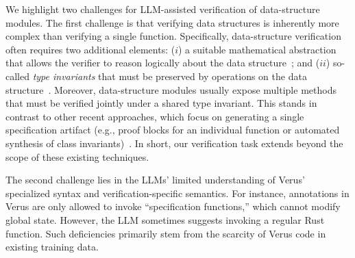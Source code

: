 We highlight two challenges for LLM-assisted verification of data-structure modules.
The first challenge is that verifying data structures is inherently more complex than verifying a single function. Specifically, data-structure verification often requires two additional elements:
($i$) a suitable mathematical abstraction that allows the verifier to reason logically about the data structure~\cite{reynolds-seplogic,parkinson-bierman,ohearn-cacm}; and ($ii$)
so-called \emph{type invariants} that must be preserved by operations on the data structure~\cite{classinvgen,pldi-invariant}.
Moreover, data-structure modules usually expose multiple methods that must be verified jointly under a shared type invariant. This stands in contrast to other recent approaches, which focus on generating a single specification artifact (e.g., proof blocks for an individual function or automated synthesis of class invariants)~\cite{autoverus,dafny-annotator,dafnysinglemethod,cav24llm,classinvgen,lemur,loopy}. In short, our verification task extends beyond the scope of these existing techniques.

The second challenge lies in the LLMs' limited understanding of Verus' specialized syntax and verification-specific semantics. For instance, annotations in Verus are only allowed to invoke ``specification functions,'' which cannot modify global state. However, the LLM sometimes suggests invoking a regular Rust function. Such deficiencies primarily stem from the scarcity of Verus code in existing training data.





